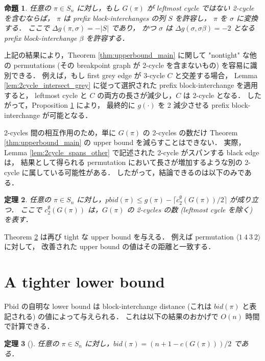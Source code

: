 \documentclass[paper=a4,fontsize=11pt,report,oneside]{jlreq}
\newtheorem{theorem}{定理}[chapter]
\newtheorem{proposition}[theorem]{命題}
\begin{document}
\begin{proposition} \label{prop:eventual_tightness}
    任意の $\pi \in S_n$ に対し，もし $G(\pi)$ が leftmost cycle ではない 2-cycle を含むならば，
    $\pi$ は prefix block-interchanges の列 $S$ を許容し，
    $\pi$ を $\sigma$ に変換する．
    ここで $\Delta g(\pi, \sigma) = -|S|$ であり，
    かつ $\sigma$ は $\Delta g(\sigma, \sigma\beta) = -2$ となる prefix block-interchange $\beta$ を許容する．
\end{proposition}


上記の結果により，Theorem \ref{thm:upperbound_main} に関して "nontight" な他の permutations
(その breakpoint graph が 2-cycle を含まないもの) を容易に識別できる．
例えば，もし first grey edge が 3-cycle $C$ と交差する場合，
Lemma \ref{lem:2cycle_intersect_grey} に従って選択された prefix block-interchange を適用すると，
leftmost cycle と $C$ の両方の長さが減少し，$C$ は 2-cycle となる．
したがって，Proposition \ref{prop:eventual_tightness} により，
最終的に $g(\cdot)$ を 2 減少させる prefix block-interchange が可能となる．

2-cycles 間の相互作用のため，単に $G(\pi)$ の 2-cycles の数だけ
Theorem \ref{thm:upperbound_main} の upper bound を減らすことはできない．
実際，Lemma \ref{lem:2cycle_spans_other} で記述された 2-cycle がスパンする black edge は，
結果として得られる permutation において長さが増加するような別の 2-cycle に属している可能性がある．
したがって，結論できるのは以下のみである．

\begin{theorem} \label{thm:improved_upperbound}
    任意の $\pi \in S_n$ に対し，$pbid(\pi) \le g(\pi) - \lceil c^\emptyset_2(G(\pi))/2 \rceil$ が成り立つ．
    ここで $c^\emptyset_2(G(\pi))$ は，$G(\pi)$ の 2-cycles の数 (leftmost cycle を除く) を表す．
\end{theorem}


Theorem \ref{thm:improved_upperbound} は再び tight な upper bound を与える．
例えば permutation $\langle 1\ 4\ 3\ 2 \rangle$ に対して，
改善された upper bound の値はその距離と一致する．

\section{A tighter lower bound}

Pbid の自明な lower bound は block-interchange distance (これは $bid(\pi)$ と表記される) の値によって与えられる．
これは以下の結果のおかげで $O(n)$ 時間で計算できる．

\begin{theorem}[\cite{labarre2013lower}] \label{thm:bid_formula}
    任意の $\pi \in S_n$ に対し，$bid(\pi) = (n + 1 - c(G(\pi)))/2$ である．
\end{theorem}
\end{document}
